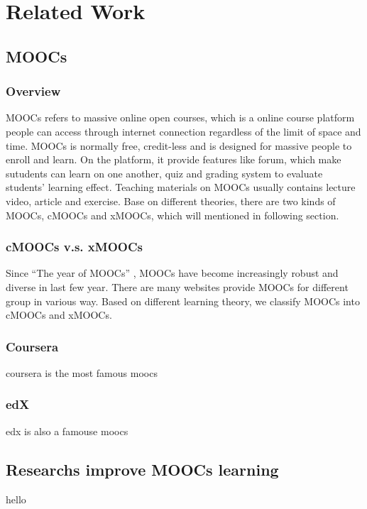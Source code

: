 \chapter{Related Work}

\section{MOOCs}

\subsection{Overview}
MOOCs refers to massive online open courses, which is a online course platform people can access through internet connection regardless of the limit of space and time.
MOOCs is normally free, credit-less and is designed for massive people to enroll and learn.
On the platform, it provide features like forum, which make sutudents can learn on one another, quiz and grading system to evaluate students' learning effect.
Teaching materials on MOOCs usually contains lecture video, article and exercise.
Base on different theories, there are two kinds of MOOCs, cMOOCs and xMOOCs, which will mentioned in following section.

\subsection{cMOOCs v.s. xMOOCs}
Since ``The year of MOOCs'' \cite{pappano2012}, MOOCs have become increasingly robust and diverse in last few year.
There are many websites provide MOOCs for different group in various way.
Based on different learning theory, we classify MOOCs into cMOOCs and xMOOCs.

\subsection{Coursera}
coursera is the most famous moocs
\subsection{edX}
edx is also a famouse moocs

\section{Researchs improve MOOCs learning}
hello
